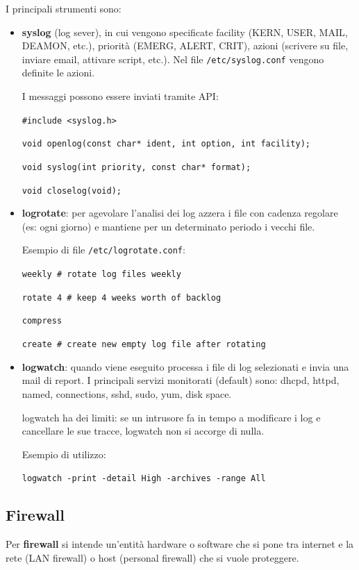             I principali strumenti sono:
            \begin{itemize}
                \item \textbf{syslog} (log sever), in cui vengono specificate facility (KERN, USER, MAIL, DEAMON, etc.), priorità (EMERG, ALERT, CRIT), azioni (scrivere su file, inviare email, attivare script, etc.).
                Nel file \verb|/etc/syslog.conf| vengono definite le azioni.

                I messaggi possono essere inviati tramite API:

                \verb|#include <syslog.h>|

                \verb|void openlog(const char* ident, int option, int facility);|

                \verb|void syslog(int priority, const char* format);|

                \verb|void closelog(void);|
                \item \textbf{logrotate}: per agevolare l'analisi dei log azzera i file con cadenza regolare (es: ogni giorno) e mantiene per un determinato periodo i vecchi file.

                Esempio di file \verb|/etc/logrotate.conf|:

                \verb|weekly # rotate log files weekly|

                \verb|rotate 4 # keep 4 weeks worth of backlog|
                
                \verb|compress|

                \verb|create # create new empty log file after rotating|
                \item \textbf{logwatch}: quando viene eseguito processa i file di log selezionati e invia una mail di report. I principali servizi monitorati (default) sono: dhcpd, httpd, named, connections, sshd, sudo, yum, disk space.
                
                logwatch ha dei limiti: se un intrusore fa in tempo a modificare i log e cancellare le sue tracce, logwatch non si accorge di nulla.
                
                Esempio di utilizzo:

                \verb|logwatch -print -detail High -archives -range All|
            \end{itemize}

    \subsection{Firewall}
        Per \textbf{firewall} si intende un'entità hardware o software che si pone tra internet e la rete (LAN firewall) o host (personal firewall) che si vuole proteggere.
    
